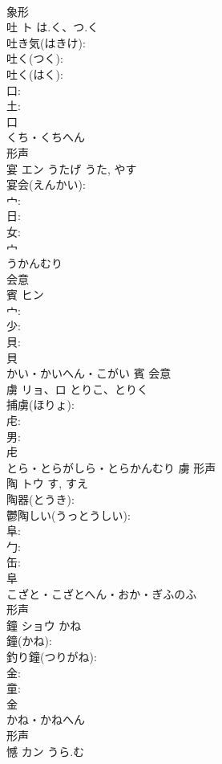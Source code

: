 \documentclass[8pt]{extreport}
\begin{document}
\begin{CJK}{UTF8}{min}
\\	象形 
\\	吐	ト	は.く、つ.く		
\\	吐き気(はきけ): 
\\	吐く(つく): 
\\	吐く(はく): 
\\	口: 
\\	土: 
\\	口	
\\	くち・くちへん	
\\	形声 
\\	宴	エン	うたげ	うた, やす	
\\	宴会(えんかい): 
\\	宀: 
\\	日: 
\\	女: 
\\	宀	
\\	うかんむり	
\\	会意 
\\	賓	ヒン			
\\	宀: 
\\	少: 
\\	貝: 
\\	貝	
\\	かい・かいへん・こがい	賓	会意 
\\	虜	リョ、ロ	とりこ、とりく		
\\	捕虜(ほりょ): 
\\	虍: 
\\	男: 
\\	虍	
\\	とら・とらがしら・とらかんむり	虜	形声 
\\	陶	トウ		す, すえ	
\\	陶器(とうき): 
\\	鬱陶しい(うっとうしい): 
\\	阜: 
\\	勹: 
\\	缶: 
\\	阜	
\\	こざと・こざとへん・おか・ぎふのふ	
\\	形声 
\\	鐘	ショウ	かね		
\\	鐘(かね): 
\\	釣り鐘(つりがね): 
\\	金: 
\\	童: 
\\	金	
\\	かね・かねへん	
\\	形声 
\\	憾	カン	うら.む		

\end{CJK}
\end{document}
